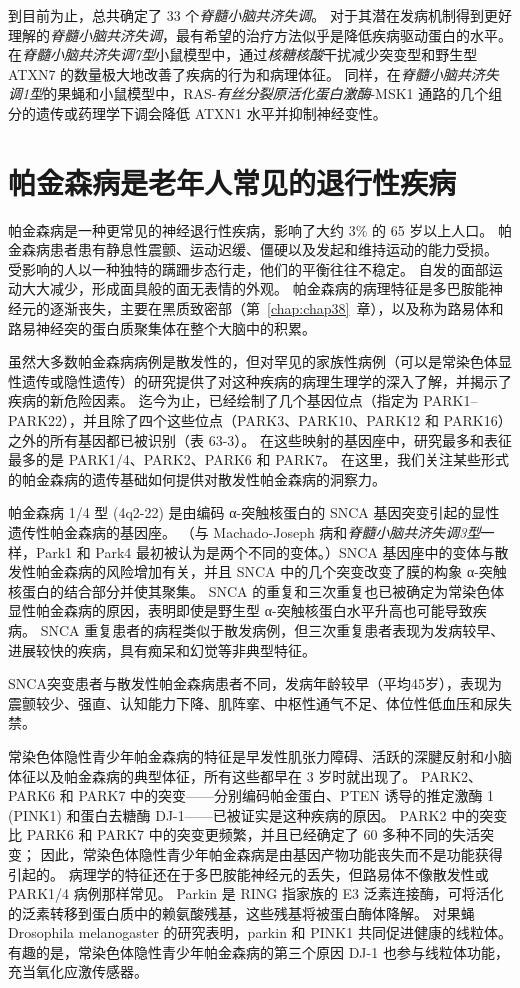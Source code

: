 到目前为止，总共确定了 33 个\textit{脊髓小脑共济失调}。
对于其潜在发病机制得到更好理解的\textit{脊髓小脑共济失调}，最有希望的治疗方法似乎是降低疾病驱动蛋白的水平。
在\textit{脊髓小脑共济失调7型}小鼠模型中，通过\textit{核糖核酸}干扰减少突变型和野生型 ATXN7 的数量极大地改善了疾病的行为和病理体征。
同样，在\textit{脊髓小脑共济失调1型}的果蝇和小鼠模型中，RAS-\textit{有丝分裂原活化蛋白激酶}-MSK1 通路的几个组分的遗传或药理学下调会降低 ATXN1 水平并抑制神经变性。



\section{帕金森病是老年人常见的退行性疾病}

帕金森病是一种更常见的神经退行性疾病，影响了大约 3\% 的 65 岁以上人口。
帕金森病患者患有静息性震颤、运动迟缓、僵硬以及发起和维持运动的能力受损。
受影响的人以一种独特的蹒跚步态行走，他们的平衡往往不稳定。
自发的面部运动大大减少，形成面具般的面无表情的外观。
帕金森病的病理特征是多巴胺能神经元的逐渐丧失，主要在黑质致密部（第~\ref{chap:chap38}~章），以及称为路易体和路易神经突的蛋白质聚集体在整个大脑中的积累。


虽然大多数帕金森病病例是散发性的，但对罕见的家族性病例（可以是常染色体显性遗传或隐性遗传）的研究提供了对这种疾病的病理生理学的深入了解，并揭示了疾病的新危险因素。
迄今为止，已经绘制了几个基因位点（指定为 PARK1–PARK22），并且除了四个这些位点（PARK3、PARK10、PARK12 和 PARK16）之外的所有基因都已被识别（表 63-3）。
在这些映射的基因座中，研究最多和表征最多的是 PARK1/4、PARK2、PARK6 和 PARK7。
在这里，我们关注某些形式的帕金森病的遗传基础如何提供对散发性帕金森病的洞察力。


帕金森病 1/4 型 (4q2-22) 是由编码 α-突触核蛋白的 SNCA 基因突变引起的显性遗传性帕金森病的基因座。
（与 Machado-Joseph 病和\textit{脊髓小脑共济失调3型}一样，Park1 和 Park4 最初被认为是两个不同的变体。）SNCA 基因座中的变体与散发性帕金森病的风险增加有关，并且 SNCA 中的几个突变改变了膜的构象 α-突触核蛋白的结合部分并使其聚集。
SNCA 的重复和三次重复也已被确定为常染色体显性帕金森病的原因，表明即使是野生型 α-突触核蛋白水平升高也可能导致疾病。
SNCA 重复患者的病程类似于散发病例，但三次重复患者表现为发病较早、进展较快的疾病，具有痴呆和幻觉等非典型特征。


SNCA突变患者与散发性帕金森病患者不同，发病年龄较早（平均45岁），表现为震颤较少、强直、认知能力下降、肌阵挛、中枢性通气不足、体位性低血压和尿失禁。


常染色体隐性青少年帕金森病的特征是早发性肌张力障碍、活跃的深腱反射和小脑体征以及帕金森病的典型体征，所有这些都早在 3 岁时就出现了。
PARK2、PARK6 和 PARK7 中的突变——分别编码帕金蛋白、PTEN 诱导的推定激酶 1 (PINK1) 和蛋白去糖酶 DJ-1——已被证实是这种疾病的原因。
PARK2 中的突变比 PARK6 和 PARK7 中的突变更频繁，并且已经确定了 60 多种不同的失活突变；
因此，常染色体隐性青少年帕金森病是由基因产物功能丧失而不是功能获得引起的。
病理学的特征还在于多巴胺能神经元的丢失，但路易体不像散发性或 PARK1/4 病例那样常见。
Parkin 是 RING 指家族的 E3 泛素连接酶，可将活化的泛素转移到蛋白质中的赖氨酸残基，这些残基将被蛋白酶体降解。
对果蝇 Drosophila melanogaster 的研究表明，parkin 和 PINK1 共同促进健康的线粒体。
有趣的是，常染色体隐性青少年帕金森病的第三个原因 DJ-1 也参与线粒体功能，充当氧化应激传感器。


